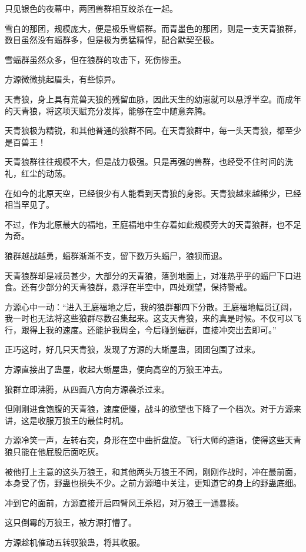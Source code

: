 \begin{this_body}
只见银色的夜幕中，两团兽群相互绞杀在一起。

雪白的那团，规模庞大，便是极乐雪蝠群。而青墨色的那团，则是一支天青狼群，数目虽然没有蝠群多，但是极为勇猛精悍，配合默契至极。

雪蝠群虽然众多，但在狼群的攻击下，死伤惨重。

方源微微挑起眉头，有些惊异。

天青狼，身上具有荒兽天狼的残留血脉，因此天生的幼崽就可以悬浮半空。而成年的天青狼，将这项天赋充分发挥，能够在空中随意奔腾。

天青狼极为精锐，和其他普通的狼群不同。在天青狼群中，每一头天青狼，都至少是百兽王！

天青狼群往往规模不大，但是战力极强。只是再强的兽群，也经受不住时间的洗礼，红尘的动荡。

在如今的北原天空，已经很少有人能看到天青狼的身影。天青狼越来越稀少，已经相当罕见了。

不过，作为北原最大的福地，王庭福地中生存着如此规模旁大的天青狼群，也不足为奇。

狼群越战越勇，蝠群渐渐不支，留下数万头蝠尸，狼狈而退。

天青狼群却是减员甚少，大部分的天青狼，落到地面上，对准热乎乎的蝠尸下口进食。还有少部分的天青狼群，悬浮在半空中，四处观望，保持警戒。

方源心中一动：“进入王庭福地之后，我的狼群都四下分散。王庭福地幅员辽阔，我一时也无法将这些狼群尽数召集起来。这支天青狼，来的真是时候。不仅可以飞行，跟得上我的速度。还能护我周全，今后碰到蝠群，直接冲突出去即可。”

正巧这时，好几只天青狼，发现了方源的大蜥屋蛊，团团包围了过来。

方源直接出了蛊屋，收起大蜥屋蛊，便向高空的万狼王冲去。

狼群立即沸腾，从四面八方向方源袭杀过来。

但刚刚进食饱腹的天青狼，速度便慢，战斗的欲望也下降了一个档次。对于方源来讲，这是收服万狼王的最佳时机。

方源冷笑一声，左转右突，身形在空中曲折盘旋。飞行大师的造诣，使得这些天青狼只能在他屁股后面吃灰。

被他打上主意的这头万狼王，和其他两头万狼王不同，刚刚作战时，冲在最前面，本身受了伤，野蛊也损失不少。之前方源暗中关注，更知道它的身上的野蛊底细。

冲到它的面前，方源直接开启四臂风王杀招，对万狼王一通暴揍。

这只倒霉的万狼王，被方源打懵了。

方源趁机催动五转驭狼蛊，将其收服。


\end{this_body}
